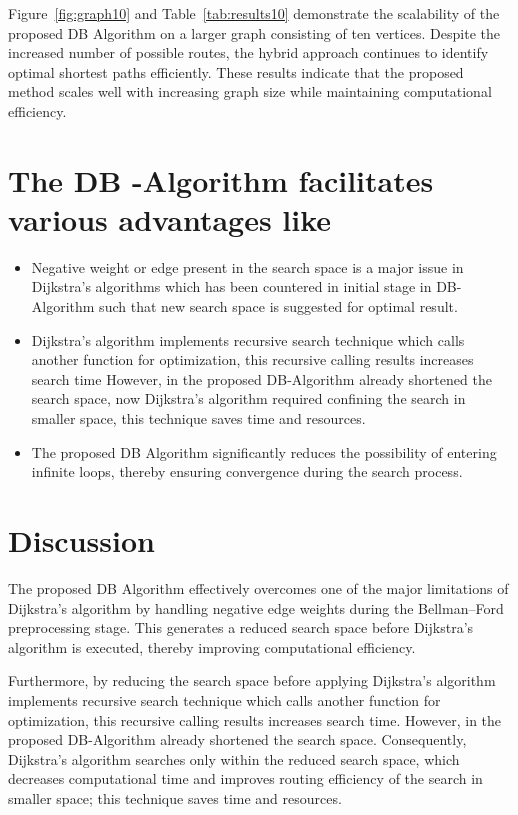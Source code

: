 \documentclass[10pt]{NSP1}
\begin{document}
	Figure~\ref{fig:graph10} and Table~\ref{tab:results10} demonstrate the scalability of the proposed DB Algorithm on a larger graph consisting of ten vertices. Despite the increased number of possible routes, the hybrid approach continues to identify optimal shortest paths efficiently. These results indicate that the proposed method scales well with increasing graph size while maintaining computational efficiency.

\section{The DB -Algorithm facilitates various advantages like}
	
	\begin{itemize}\setlength{\itemsep}{2pt}\setlength{\parskip}{0pt}
		\item[\textbf{a)}] Negative weight or edge present in the search space is a major issue in Dijkstra's algorithms which has been countered in initial stage in DB-Algorithm such that new search space is suggested for optimal result.
		\item[\textbf{b)}] Dijkstra's algorithm implements recursive search technique which calls another function for optimization, this recursive calling results increases search time However, in the proposed DB-Algorithm already shortened the search space, now Dijkstra's algorithm required confining the search in smaller space, this technique saves time and resources.
		\item[\textbf{c)}] The proposed DB Algorithm significantly reduces the possibility of entering infinite loops, thereby ensuring convergence during the search process.
	\end{itemize}
	
	\section{Discussion}
	
	The proposed DB Algorithm effectively overcomes one of the major limitations of Dijkstra's algorithm by handling negative edge weights during the Bellman--Ford preprocessing stage. This generates a reduced search space before Dijkstra's algorithm is executed, thereby improving computational efficiency.
	
	Furthermore, by reducing the search space before applying Dijkstra's algorithm implements recursive search technique which calls another function for optimization, this recursive calling results increases search time. However, in the proposed DB-Algorithm already shortened the search space. Consequently, Dijkstra's algorithm searches only within the reduced search space, which decreases computational time and improves routing efficiency of the search in smaller space; this technique saves time and resources.
	
\end{document}

